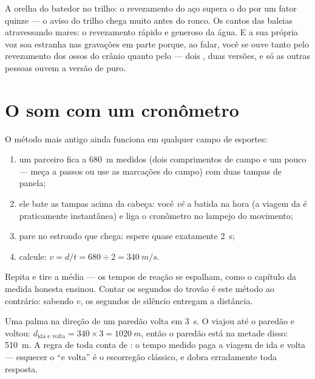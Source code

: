 \begin{example}\label{ex:g7:sound-production:scenes}
A orelha do batedor no trilho: o revezamento do aço supera o do 
por um fator quinze --- o aviso do trilho chega muito antes do ronco.
Os cantos das baleias atravessando mares: o revezamento rápido e
generoso da água. E a sua própria voz soa estranha nas gravações em
parte porque, ao falar, você se ouve tanto pelo revezamento dos ossos
do crânio quanto pelo  --- dois , duas versões, e só as outras
pessoas ouvem a versão de  puro.
\end{example}

\section{O som com um cronômetro}

\begin{method}\label{met:g7:sound-production:measure}
O método mais antigo ainda funciona em qualquer campo de esportes:
\begin{enumerate}
  \item um parceiro fica a \qty{680}{m} medidos (dois comprimentos de
        campo e um pouco --- meça a passos ou use as marcações do
        campo) com duas tampas de panela;
  \item ele bate as tampas acima da cabeça: você \emph{vê} a batida
        na hora (a viagem da  é praticamente instantânea) e liga o
        cronômetro no lampejo do movimento;
  \item pare no estrondo que chega: espere quase exatamente
        \qty{2}{s};
  \item calcule: $v = d/t = 680 \div 2 = \qty{340}{m/s}$.
\end{enumerate}
Repita e tire a média --- os tempos de reação se espalham, como o
capítulo da medida honesta ensinou. Contar os segundos do trovão é
este método ao contrário: sabendo $v$, os segundos de silêncio
entregam a distância.
\end{method}

\begin{example}\label{ex:g7:sound-production:echo}
Uma palma na direção de um paredão volta em \qty{3}{s}. O  viajou
até o paredão e voltou:
$d_{\text{ida e volta}} = 340 \times 3 = \qty{1020}{m}$, então o
paredão está na metade disso: \qty{510}{m}. A regra de toda conta de
: o tempo medido paga a viagem de ida e volta --- esquecer o ``e
volta'' é o escorregão clássico, e dobra erradamente toda resposta.
\end{example}

